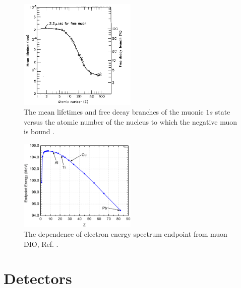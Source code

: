 \begin{figure}[!h]
\centering
\includegraphics[width =0.5\textwidth]{figures/png/lifetime_mu_matter.png}
\caption{ The mean lifetimes and free decay branches of the muonic $1s$ state versus the atomic number of the nucleus to which the negative muon is bound \cite{TYamazaki_1975}.}
\label{fig:muonicatom}
\end{figure}
\begin{figure}[!h]
\centering
\includegraphics[width =0.5\textwidth]{figures/png/endopint.png}
\caption{ The dependence of electron energy spectrum endpoint from muon DIO, Ref. \cite{dukes}.}
\label{fig:endpoint}
\end{figure}


\section{Detectors}
